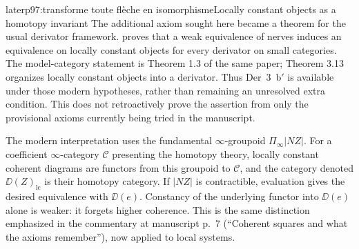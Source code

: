 \begin{dcomment}{later}{p97:transforme toute flèche en isomorphisme}{Locally constant objects as a homotopy invariant}
The additional axiom sought here became a theorem for the usual derivator framework. \citet[Corollary 3.8]{Cisinski2009LocallyConstant} proves that a weak equivalence of nerves induces an equivalence on locally constant objects for every derivator on small categories. The model-category statement is Theorem 1.3 of the same paper; Theorem 3.13 organizes locally constant objects into a derivator. Thus Der~3~b$'$ is available under those modern hypotheses, rather than remaining an unresolved extra condition. This does not retroactively prove the assertion from only the provisional axioms currently being tried in the manuscript.

The modern interpretation uses the fundamental $\infty$-groupoid $\Pi_\infty|NZ|$. For a coefficient $\infty$-category $\mathcal C$ presenting the homotopy theory, locally constant coherent diagrams are functors from this groupoid to $\mathcal C$, and the category denoted $\DD(Z)_{\mathrm{lc}}$ is their homotopy category. If $|NZ|$ is contractible, evaluation gives the desired equivalence with $\DD(e)$. Constancy of the underlying functor into $\DD(e)$ alone is weaker: it forgets higher coherence. This is the same distinction emphasized in the commentary at manuscript p.~7 (``Coherent squares and what the axioms remember''), now applied to local systems.
\end{dcomment}

